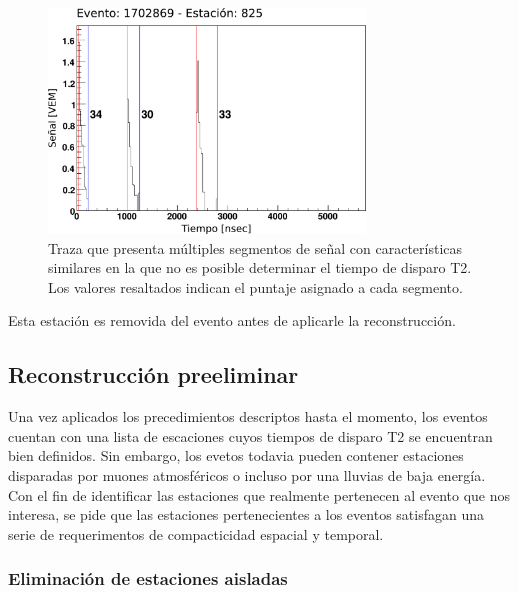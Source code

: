 		\begin{figure}[ht]
			\begin{center}
			\includegraphics[width=0.75\textwidth]{fig/seleccionAuger/multipicos.pdf}
			\caption{Traza que presenta múltiples segmentos de señal con características similares en la que no es posible determinar el tiempo de disparo T2. Los valores resaltados indican el puntaje asignado a cada segmento.}
			\label{fig:multipicos}
			\end{center}
		\end{figure}
		Esta estación es removida del evento antes de aplicarle la reconstrucción.
		
	\subsection{Reconstrucción preeliminar}
	
	Una vez aplicados los precedimientos descriptos hasta el momento, los eventos cuentan con una lista de escaciones cuyos tiempos de disparo T2 se encuentran bien definidos.
	Sin embargo, los evetos todavia pueden contener estaciones disparadas por muones atmosféricos o incluso por una lluvias de baja energía.
	Con el fin de identificar las estaciones que realmente pertenecen al evento que nos interesa, se pide que las estaciones pertenecientes a los eventos satisfagan una serie de requerimentos de compacticidad espacial y temporal.
	
	\subsubsection{Eliminación de estaciones aisladas} 
	
